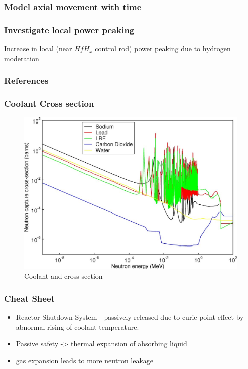 \documentclass[9pt]{beamer}
\newcommand{\hfh}{$HfH_{x}$\xspace}
\begin{document}
\begin{frame}
\frametitle{Model axial movement with time}

\end{frame}

\begin{frame}
\frametitle{Investigate local power peaking}
Increase in local (near \hfh control rod) power peaking
due to hydrogen moderation
\end{frame}

\begin{frame}
\frametitle{}
\end{frame}

\begin{frame}[allowframebreaks]
  \frametitle{References}
  
  {\footnotesize  }
\end{frame}



\begin{frame}
\frametitle{Coolant Cross section}
\begin{figure}[htbp!]
  \begin{center}
      \includegraphics[scale=0.7]{./images/coolant.jpg}
  \end{center}
  \caption{Coolant and cross section \cite{stacey_nuclear_2007}}
  \label{fig:reac}
\end{figure}
\end{frame}

\begin{frame}
\frametitle{Cheat Sheet}
\begin{itemize}
  \item Reactor Shutdown System - passively released due to curie point effect by abnormal rising of coolant temperature.
  \item Passive safety -> thermal expansion of absorbing liquid
  \item gas expansion leads to more neutron leakage
\end{itemize}
\end{frame}
\end{document}
